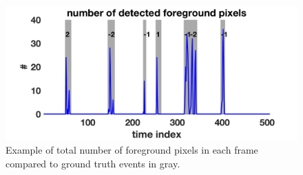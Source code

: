 \documentclass[12pt,oneside]{article} %
\begin{document}
\begin{figure}[htb]  %
\centering
\includegraphics[scale=0.45]{images/abs_example.png}
\caption{Example of total number of foreground pixels in each frame compared to 
ground truth events in gray.}
\label{abs_example}
\end{figure}
\end{document}
